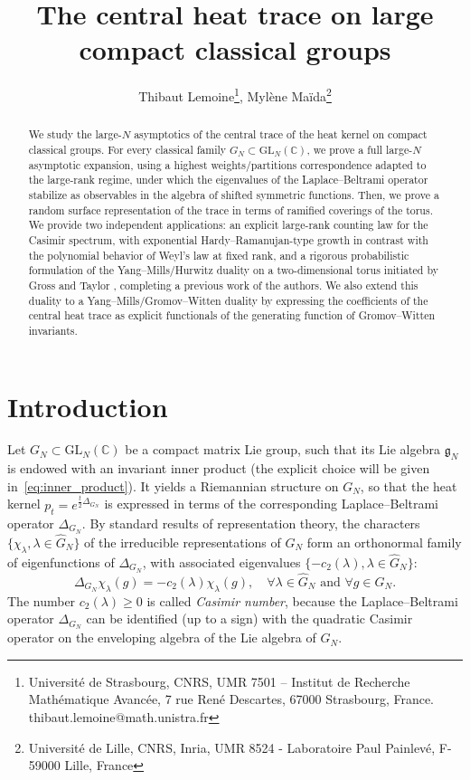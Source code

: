 \documentclass[11pt,a4paper,reqno]{article}
\title{The central heat trace on large compact classical groups}
\author{Thibaut Lemoine\thanks{Universit\'e de Strasbourg, CNRS, UMR 7501 -- Institut de Recherche Math\'ematique Avanc\'ee, 7 rue Ren\'e Descartes, 67000 Strasbourg, France. thibaut.lemoine@math.unistra.fr}, Myl\`ene Ma\"ida\thanks{Université de Lille, CNRS, Inria, UMR 8524 - Laboratoire Paul Painlevé, F-59000 Lille, France}}
\theoremstyle{definition}
\theoremstyle{remark}
\newcommand\GL{{\mathrm{GL}}}
\newcommand\C{\mathbb{C}}
\begin{document}
\maketitle

\begin{abstract}
We study the large-$N$ asymptotics of the central trace of the heat kernel on compact classical groups. For every classical family $G_N\subset \mathrm{GL}_N(\C)$, we prove a full large-$N$ asymptotic expansion, using a highest weights/partitions correspondence adapted to the large-rank regime, under which the eigenvalues of the Laplace--Beltrami operator stabilize as observables in the algebra of shifted symmetric functions. Then, we prove a random surface representation of the trace in terms of ramified coverings of the torus. We provide two independent applications: an explicit large-rank counting law for the Casimir spectrum, with exponential Hardy--Ramanujan-type growth in contrast with the polynomial behavior of Weyl's law at fixed rank, and a rigorous probabilistic formulation of the Yang--Mills/Hurwitz duality on a two-dimensional torus initiated by Gross and Taylor \cite{GT,GT2}, completing a previous work \cite{LM2} of the authors. We also extend this duality to a Yang--Mills/Gromov--Witten duality by expressing the coefficients of the central heat trace as explicit functionals of the generating function of Gromov--Witten invariants.
\end{abstract}

\tableofcontents

\section{Introduction}

Let $G_N\subset\GL_N(\C)$ be a compact matrix Lie group, such that its Lie algebra $\mathfrak{g}_N$ is endowed with an invariant inner product (the explicit choice will be given in~\eqref{eq:inner_product}). It yields a Riemannian structure on $G_N$, so that the heat kernel $p_t=e^{\frac{t}{2}\Delta_{G_N}}$ is expressed in terms of the corresponding Laplace--Beltrami operator $\Delta_{G_N}.$ By standard results of representation theory, the characters $\{\chi_\lambda,\lambda\in\widehat{G}_N\}$ of the irreducible representations of $G_N$ form an orthonormal family of eigenfunctions of $\Delta_{G_N}$, with associated eigenvalues $\{-c_2(\lambda),\lambda\in\widehat{G}_N\}$:
\[
\Delta_{G_N}\chi_\lambda(g)=-c_2(\lambda)\chi_\lambda(g),\quad \forall \lambda\in\widehat{G}_N \text{ and } \forall g\in G_N.
\]
The number $c_2(\lambda)\geq 0$ is called \emph{Casimir number}, because the Laplace--Beltrami operator $\Delta_{G_N}$ can be identified (up to a sign) with the quadratic Casimir operator on the enveloping algebra of the Lie algebra of $G_N$.
\end{document}
